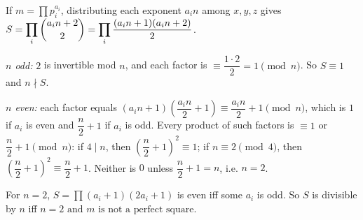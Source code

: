 If $m=\prod p_i^{a_i}$, distributing each exponent $a_in$ among $x,y,z$ gives $S=\displaystyle\prod_i\dbinom{a_in+2}2=\prod_i\dfrac{(a_in+1)(a_in+2)}2$.

\emph{$n$ odd:} $2$ is invertible mod $n$, and each factor is $\equiv\dfrac{1\cdot2}2=1\pmod n$. So $S\equiv1$ and $n\nmid S$.

\emph{$n$ even:} each factor equals $(a_in+1)\left(\dfrac{a_in}2+1\right)\equiv\dfrac{a_in}2+1\pmod n$, which is $1$ if $a_i$ is even and $\dfrac n2+1$ if $a_i$ is odd. Every product of such factors is $\equiv1$ or $\dfrac n2+1\pmod n$: if $4\mid n$, then $\left(\dfrac n2+1\right)^2\equiv1$; if $n\equiv2\pmod4$, then $\left(\dfrac n2+1\right)^2\equiv\dfrac n2+1$. Neither is $0$ unless $\dfrac n2+1=n$, i.e. $n=2$.

For $n=2$, $S=\prod(a_i+1)(2a_i+1)$ is even iff some $a_i$ is odd. So $S$ is divisible by $n$ iff $\boxed{n=2\text{ and }m\text{ is not a perfect square}}$.
